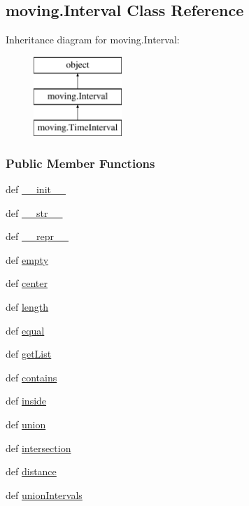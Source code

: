 \hypertarget{classmoving_1_1Interval}{\subsection{moving.\-Interval Class Reference}
\label{classmoving_1_1Interval}
}
Inheritance diagram for moving.\-Interval\-:\begin{figure}[H]
\begin{center}
\leavevmode
\includegraphics[height=3.000000cm]{classmoving_1_1Interval}
\end{center}
\end{figure}
\subsubsection*{Public Member Functions}
\begin{DoxyCompactItemize}
\item 
def \hyperlink{classmoving_1_1Interval_aa5eb3a435630c3c49b7c9a82a4d94b2d}{\-\_\-\-\_\-init\-\_\-\-\_\-}
\item 
def \hyperlink{classmoving_1_1Interval_ae25c61fee4181e5f514f697d6c5e48cf}{\-\_\-\-\_\-str\-\_\-\-\_\-}
\item 
def \hyperlink{classmoving_1_1Interval_ab04a2196fce936523edb9623b8f9dbb3}{\-\_\-\-\_\-repr\-\_\-\-\_\-}
\item 
def \hyperlink{classmoving_1_1Interval_a8c36083e8be78a79dda30c61fba71345}{empty}
\item 
def \hyperlink{classmoving_1_1Interval_a8cb325bee4428566f60d2c8b5e05962b}{center}
\item 
def \hyperlink{classmoving_1_1Interval_a757517d0850d1d93f9d04feb67c8797e}{length}
\item 
def \hyperlink{classmoving_1_1Interval_a021a0fb3910059e791e7ff9b277c2fca}{equal}
\item 
def \hyperlink{classmoving_1_1Interval_af8f41fb993da99a0a0a0a98d9b61a837}{get\-List}
\item 
def \hyperlink{classmoving_1_1Interval_adc454efd28e4ed275e1797d91708e550}{contains}
\item 
def \hyperlink{classmoving_1_1Interval_a46b32c9b16d430d6ae8e4b306cf1d2de}{inside}
\item 
def \hyperlink{classmoving_1_1Interval_ac7d8fca6600e97f5c342b957cfe82aec}{union}
\item 
def \hyperlink{classmoving_1_1Interval_a7cec40b2bf70166639d360d8fda3d20c}{intersection}
\item 
def \hyperlink{classmoving_1_1Interval_a17fab283bc671da2484217c5b4ed34e8}{distance}
\item 
def \hyperlink{classmoving_1_1Interval_a810cd43a545f5ca08edbc20643eebe84}{union\-Intervals}
\end{DoxyCompactItemize}
